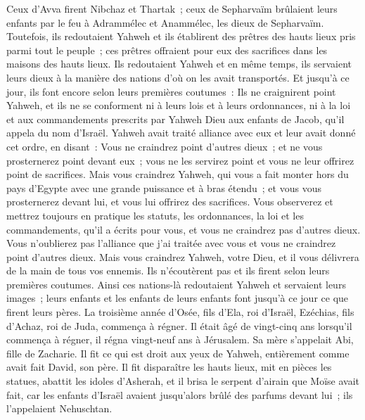 \begin{multicols}{2}
Ceux d'Avva firent Nibchaz et Thartak~; ceux de Sepharvaïm brûlaient leurs enfants par le feu à Adrammélec et Anammélec, les dieux de Sepharvaïm.
Toutefois, ils redoutaient Yahweh et ils établirent des prêtres des hauts lieux pris parmi tout le peuple~; ces prêtres offraient pour eux des sacrifices dans les maisons des hauts lieux.
Ils redoutaient Yahweh et en même temps, ils servaient leurs dieux à la manière des nations d'où on les avait transportés.
Et jusqu'à ce jour, ils font encore selon leurs premières coutumes~: Ils ne craignirent point Yahweh, et ils ne se conforment ni à leurs lois et à leurs ordonnances, ni à la loi et aux commandements prescrits par Yahweh Dieu aux enfants de Jacob, qu'il appela du nom d'Israël.
Yahweh avait traité alliance avec eux et leur avait donné cet ordre, en disant~: Vous ne craindrez point d'autres dieux~; et ne vous prosternerez point devant eux~; vous ne les servirez point et vous ne leur offrirez point de sacrifices.
Mais vous craindrez Yahweh, qui vous a fait monter hors du pays d'Egypte avec une grande puissance et à bras étendu~; et vous vous prosternerez devant lui, et vous lui offrirez des sacrifices.
Vous observerez et mettrez toujours en pratique les statuts, les ordonnances, la loi et les commandements, qu'il a écrits pour vous, et vous ne craindrez pas d'autres dieux.
Vous n'oublierez pas l'alliance que j'ai traitée avec vous et vous ne craindrez point d'autres dieux.
Mais vous craindrez Yahweh, votre Dieu, et il vous délivrera de la main de tous vos ennemis.
Ils n'écoutèrent pas et ils firent selon leurs premières coutumes.
Ainsi ces nations-là redoutaient Yahweh et servaient leurs images~; leurs enfants et les enfants de leurs enfants font jusqu'à ce jour ce que firent leurs pères.
\VerseOne{}La troisième année d'Osée, fils d'Ela, roi d'Israël, Ezéchias, fils d'Achaz, roi de Juda, commença à régner.
Il était âgé de vingt-cinq ans lorsqu'il commença à régner, il régna vingt-neuf ans à Jérusalem. Sa mère s'appelait Abi, fille de Zacharie.
Il fit ce qui est droit aux yeux de Yahweh, entièrement comme avait fait David, son père.
Il fit disparaître les hauts lieux, mit en pièces les statues, abattit les idoles d'Asherah, et il brisa le serpent d'airain que Moïse avait fait, car les enfants d'Israël avaient jusqu'alors brûlé des parfums devant lui~; ils l'appelaient Nehuschtan.

\end{multicols}
